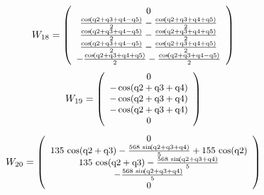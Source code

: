 \documentclass[fleqn, a4paper, 5pt, russian]{article}
\begin{document}
\begin{landscape}
\begin{equation}
{}\end{equation}
\begin{equation}
\small{
	W_{18}=
	\left(\begin{array}{c} 0\\ \frac{\cos\!\left(\mathrm{q2} + \mathrm{q3} + \mathrm{q4} - \mathrm{q5}\right)}{2} - \frac{\cos\!\left(\mathrm{q2} + \mathrm{q3} + \mathrm{q4} + \mathrm{q5}\right)}{2}\\ \frac{\cos\!\left(\mathrm{q2} + \mathrm{q3} + \mathrm{q4} - \mathrm{q5}\right)}{2} - \frac{\cos\!\left(\mathrm{q2} + \mathrm{q3} + \mathrm{q4} + \mathrm{q5}\right)}{2}\\ \frac{\cos\!\left(\mathrm{q2} + \mathrm{q3} + \mathrm{q4} - \mathrm{q5}\right)}{2} - \frac{\cos\!\left(\mathrm{q2} + \mathrm{q3} + \mathrm{q4} + \mathrm{q5}\right)}{2}\\  - \frac{\cos\!\left(\mathrm{q2} + \mathrm{q3} + \mathrm{q4} + \mathrm{q5}\right)}{2} - \frac{\cos\!\left(\mathrm{q2} + \mathrm{q3} + \mathrm{q4} - \mathrm{q5}\right)}{2} \end{array}\right)
}\end{equation}
\begin{equation}
\small{
	W_{19}=
	\left(\begin{array}{c} 0\\ - \cos\!\left(\mathrm{q2} + \mathrm{q3} + \mathrm{q4}\right)\\ - \cos\!\left(\mathrm{q2} + \mathrm{q3} + \mathrm{q4}\right)\\ - \cos\!\left(\mathrm{q2} + \mathrm{q3} + \mathrm{q4}\right)\\ 0 \end{array}\right)
}\end{equation}
\begin{equation}
\small{
	W_{20}=
	\left(\begin{array}{c} 0\\ 135\, \cos\!\left(\mathrm{q2} + \mathrm{q3}\right) - \frac{568\, \sin\!\left(\mathrm{q2} + \mathrm{q3} + \mathrm{q4}\right)}{5} + 155\, \cos\!\left(\mathrm{q2}\right)\\ 135\, \cos\!\left(\mathrm{q2} + \mathrm{q3}\right) - \frac{568\, \sin\!\left(\mathrm{q2} + \mathrm{q3} + \mathrm{q4}\right)}{5}\\ -\frac{568\, \sin\!\left(\mathrm{q2} + \mathrm{q3} + \mathrm{q4}\right)}{5}\\ 0 \end{array}\right)
}\end{equation}
\begin{equation}

\end{equation}
\end{landscape}
\end{document}
